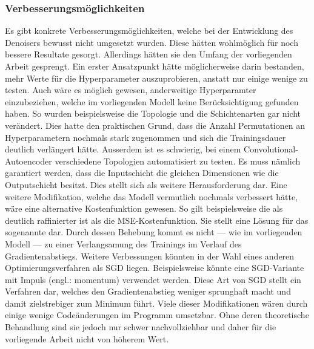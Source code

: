 \subsubsection{Verbesserungsmöglichkeiten}
Es gibt konkrete Verbesserungsmöglichkeiten, welche bei der Entwicklung
des Denoisers bewusst nicht umgesetzt wurden.
Diese hätten wohlmöglich für noch bessere Resultate gesorgt. Allerdings hätten
sie den Umfang der vorliegenden Arbeit gesprengt.
\para{}
Ein erster Ansatzpunkt hätte möglicherweise darin bestanden, mehr Werte für die
Hyperparameter auszuprobieren, anstatt nur einige wenige zu testen.
\para{}
Auch wäre es möglich gewesen, anderweitige
Hyperparamter einzubeziehen, welche im vorliegenden Modell keine
Berücksichtigung gefunden haben. So wurden beispielsweise die Topologie und die
Schichtenarten gar nicht verändert. Dies hatte den
praktischen Grund, dass die Anzahl Permutationen an Hyperparametern nochmals
stark zugenommen und sich die Trainingsdauer deutlich verlängert hätte.
Ausserdem ist es schwierig, bei einem Convolutional-Autoencoder verschiedene
Topologien automatisiert zu testen. Es muss nämlich garantiert werden, dass die
Inputschicht die gleichen Dimensionen wie die Outputschicht besitzt. Dies stellt
sich als weitere Herausforderung dar.
\para{}
Eine weitere Modifikation, welche das Modell vermutlich nochmals verbessert hätte,
wäre eine alternative Kostenfunktion gewesen. So gilt beispielsweise die
 als deutlich raffinierter ist als die MSE-Kostenfunktion.
Sie stellt eine Lösung für das sogenannte 
dar. Durch dessen Behebung kommt es nicht --- wie im vorliegenden Modell --- zu einer Verlangsamung des Trainings im
Verlauf des Gradientenabstiegs.
\para{}
Weitere Verbessungen könnten in der Wahl eines anderen
Optimierungsverfahren als SGD liegen. Beispielsweise könnte eine SGD-Variante mit
Impuls (engl.: momentum) verwendet werden. Diese Art von SGD stellt ein
Verfahren dar, welches den Gradientenabstieg weniger sprunghaft macht und damit
zielstrebiger zum Minimum führt.
\para{}
Viele dieser Modifikationen wären durch einige wenige Codeänderungen im Programm
umsetzbar. Ohne deren theoretische Behandlung sind sie jedoch nur schwer
nachvollziehbar und daher für die vorliegende Arbeit nicht von höherem Wert.



